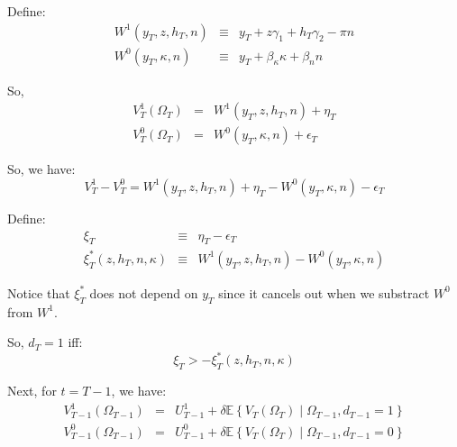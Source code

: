 \noindent Define:
\begin{eqnarray*}
W^1 \left(y_T, z,h_T,n\right) & \equiv & y_T + z \gamma_1 + h_T \gamma_2 - \pi n\\
W^0 \left(y_T, \kappa,n\right) & \equiv & y_T + \beta_\kappa \kappa + \beta_n n
\end{eqnarray*}

\noindent So, 
\begin{eqnarray*}
V_T^1\left(\Omega_T\right) &=& W^1\left(y_T, z,h_T,n\right) + \eta_T \\
V_T^0\left(\Omega_T\right) &=& W^0\left(y_T, \kappa,n\right) + \epsilon_T
\end{eqnarray*}

\noindent So, we have:
\begin{equation*}
V^1_T - V^0_T =  W^1\left(y_T, z,h_T,n\right) + \eta_T -   W^0\left(y_T, \kappa,n\right) - \epsilon_T
\end{equation*}

\noindent Define:
\begin{eqnarray*}
\xi_T & \equiv & \eta_T - \epsilon_T \\
\xi^{*}_T\left(z,h_T,n,\kappa\right) & \equiv & W^1\left(y_T, z,h_T,n\right) - W^0\left(y_T, \kappa,n\right)
\end{eqnarray*}

\noindent Notice that $\xi_T^*$ does not depend on $y_T$ since it cancels out when we substract $W^0$ from $W^1$. 

\noindent So, $d_T=1$ iff:
\begin{equation*}
\xi_T > -\xi^{*}_T\left(z,h_T,n,\kappa\right)
\end{equation*} 

\noindent Next, for $t = T-1$, we have:
\begin{eqnarray*}
V^{1}_{T-1}\left(\Omega_{T-1}\right) &=& U^{1}_{T-1} + 
\delta \mathbb{E} \left\{ V_T\left(\Omega_T\right) \middle| \Omega_{T-1}, d_{T-1}=1\right\} \\
V^{0}_{T-1}\left(\Omega_{T-1}\right) &=& U^{0}_{T-1} + 
\delta \mathbb{E} \left\{ V_T\left(\Omega_T\right) \middle| \Omega_{T-1}, d_{T-1}=0\right\}
\end{eqnarray*}

